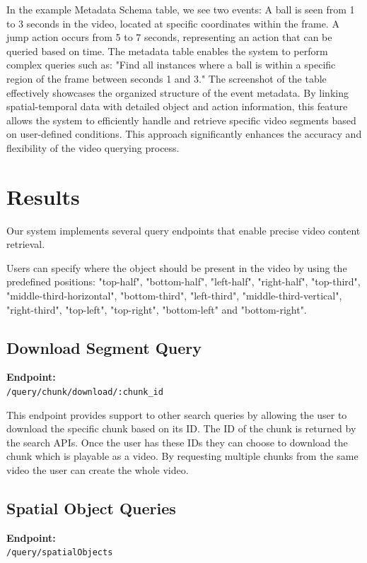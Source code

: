 \documentclass[conference]{IEEEtran}
\begin{document}
In the example Metadata Schema table, we see two events:
    A ball is seen from 1 to 3 seconds in the video, located at specific coordinates within the frame.
    A jump action occurs from 5 to 7 seconds, representing an action that can be queried based on time.
The metadata table enables the system to perform complex queries such as:
    "Find all instances where a ball is within a specific region of the frame between seconds 1 and 3."
The screenshot of the table effectively showcases the organized structure of the event metadata. By linking spatial-temporal data with detailed object and action information, this feature allows the system to efficiently handle and retrieve specific video segments based on user-defined conditions. This approach significantly enhances the accuracy and flexibility of the video querying process.


\section{Results}
\label{sec:results}
Our system implements several query endpoints that enable precise video content retrieval.

Users can specify where the object should be present in the video by using the predefined positions: "top-half", "bottom-half", "left-half", "right-half", "top-third", "middle-third-horizontal", "bottom-third", "left-third", "middle-third-vertical", "right-third", "top-left", "top-right", "bottom-left" and "bottom-right".

\subsection{Download Segment Query}
\textbf{Endpoint:} \\
\texttt{/query/chunk/download/:chunk\_id}

This endpoint provides support to other search queries by allowing the user to download the specific chunk based on its ID. The ID of the chunk is returned by the search APIs. Once the user has these IDs they can choose to download the chunk which is playable as a video. By requesting multiple chunks from the same video the user can create the whole video.

\subsection{Spatial Object Queries}
\textbf{Endpoint:} \\ 
\texttt{/query/spatialObjects}
\end{document}
